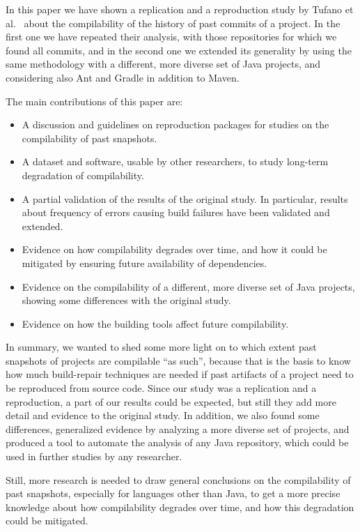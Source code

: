 In this paper we have shown a replication and a reproduction study by Tufano et al.~\cite{tufano2017there} about the compilability of the history of past commits of a project. In the first one we have repeated their analysis, with those repositories for which we found all commits, and in the second one we extended its generality by using the same methodology with a different, more diverse set of Java projects, and considering also Ant and Gradle in addition to Maven.

The main contributions of this paper are:

\begin{itemize}
\item A discussion and guidelines on reproduction packages for studies on the compilability of past snapshots. 
\item A dataset and software, usable by other researchers, to study long-term degradation of compilability.
\item A partial validation of the results of the original study. In particular, results about frequency of errors causing build failures have been validated and extended.
\item Evidence on how compilability degrades over time, and how it could be mitigated by ensuring future availability of dependencies.
\item Evidence on the compilability of a different, more diverse set of Java projects, showing some differences with the original study.
\item Evidence on how the building tools affect future compilability.
\end{itemize}

In summary, we wanted to shed some more light on to which extent past snapshots of projects are compilable ``as such'', because that is the basis to know how much build-repair techniques are needed if past artifacts of a project need to be reproduced from source code.
Since our study was a replication and a reproduction, a part of our results could be expected, but still they add more detail and evidence to the original study. In addition, we also found some differences, generalized evidence by analyzing a more diverse set of projects, and produced a tool to automate the analysis of any Java repository, which could be used in further studies by any researcher.

Still, more research is needed to draw general conclusions on the compilability of past snapshots, especially for languages other than Java, to get a more precise knowledge about how compilability degrades over time, and how this degradation could be mitigated.

